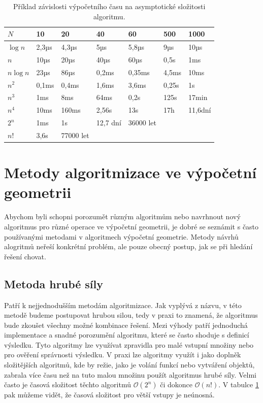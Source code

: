 	
\begin{table}

\begin{tabular}{ |p{1.4cm}||p{1.6cm}|p{1.6cm}|p{1.6cm}|p{1.6cm}|p{1.6cm}|p{1.6cm}|  }
\hline

$N$				&10			&20			&40			&60			&500		&1000\\
\hline
$\log n$		&2,3µs		&4,3µs		&5µs		&5,8µs		&9µs		&10µs\\			
$n$				&10µs		&20µs		&40µs		&60µs		&0,5s		&1ms\\
$n \log n$		&23µs		&86µs		&0,2ms		&0,35ms		&4,5ms		&10ms\\
$n^2$			&0,1ms		&0,4ms		&1,6ms		&3,6ms		&0,25s		&1s\\
$n^3$			&1ms		&8ms		&64ms		&0,2s		&125s		&17min\\
$n^4$			&10ms		&160ms		&2,56s		&13s		&17h		&11,6dní\\
$2^n$			&1ms		&1s			&12,7 dní	&36000 let	&			&\\
$n!$			&3,6s		&77000 let	&			&			&			&\\
\hline

\end{tabular}
\caption{Příklad závislosti výpočetního času na asymptotické složitosti algoritmu.}
\label{tab:4-time_complexity}
\end{table}

\section{Metody algoritmizace ve výpočetní geometrii}
	Abychom byli schopni porozumět různým algoritmům nebo navrhnout nový algoritmus pro různé operace ve výpočetní geometrii, je dobré se seznámit s často používanými metodami v algoritmech výpočetní geometrie. Metody návrhů alogritmů neřeší konkrétní problém, ale pouze obecný postup, jak se při hledání řešení chovat.

\subsection{Metoda hrubé síly}
	Patří k nejjednodušším metodám algoritmizace. Jak vyplývá z názvu, v této metodě budeme postupovat hrubou silou, tedy v praxi to znamená, že algoritmus bude zkou\-šet všechny možné kombinace řešení. Mezi výhody patří jednoduchá implementace a snadné porozumění algoritmu, které se často shoduje s definicí výsledku. Tyto algoritmy lze využívat zpravidla pro malé vstupní množiny nebo pro ověření správnosti výsledku. V praxi lze algoritmy využít i jako doplněk složitějších algoritmů, kde by režie, jako je volání funkcí nebo vytváření objektů, zabrala více času než na tuto malou množinu použít algoritmus hrubé síly. Velmi často je časová složitost těchto algoritmů $\mathcal{O}(2^n)$ či dokonce $\mathcal{O}(n!)$. V tabulce \ref{tab:4-time_complexity} pak můžeme vidět, že časová složitost pro větší vstupy je neúnosná.
	
